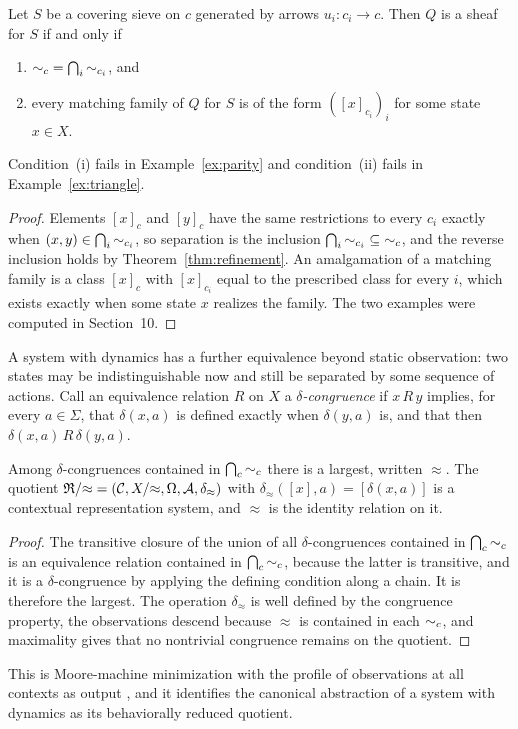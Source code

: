 \begin{proposition}\label{prop:Qglue}
Let $S$ be a covering sieve on $c$ generated by arrows $u_i:c_i\to c$. Then $Q$ is a sheaf for $S$ if and only if
\begin{enumerate}[label=(\roman*)]
\item ${\sim_c}=\bigcap_i{\sim_{c_i}}$, and
\item every matching family of $Q$ for $S$ is of the form $([x]_{c_i})_i$ for some state $x\in X$.
\end{enumerate}
Condition~(i) fails in Example~\ref{ex:parity} and condition~(ii) fails in Example~\ref{ex:triangle}.
\end{proposition}
\begin{proof}
Elements $[x]_c$ and $[y]_c$ have the same restrictions to every $c_i$ exactly when $(x,y)\in\bigcap_i{\sim_{c_i}}$, so separation is the inclusion $\bigcap_i{\sim_{c_i}}\subseteq{\sim_c}$, and the reverse inclusion holds by Theorem~\ref{thm:refinement}. An amalgamation of a matching family is a class $[x]_c$ with $[x]_{c_i}$ equal to the prescribed class for every $i$, which exists exactly when some state $x$ realizes the family. The two examples were computed in Section~10.
\end{proof}

A system with dynamics has a further equivalence beyond static observation: two states may be indistinguishable now and still be separated by some sequence of actions. Call an equivalence relation $R$ on $X$ a \emph{$\delta$-congruence} if $x\,R\,y$ implies, for every $a\in\Sigma$, that $\delta(x,a)$ is defined exactly when $\delta(y,a)$ is, and that then $\delta(x,a)\,R\,\delta(y,a)$.

\begin{proposition}\label{prop:minimization}
Among $\delta$-congruences contained in $\bigcap_c{\sim_c}$ there is a largest, written $\approx$. The quotient $\mathfrak R/{\approx}=(\mathcal C,X/{\approx},\Omega,\mathcal A,\delta_{\approx})$ with $\delta_{\approx}([x],a)=[\delta(x,a)]$ is a contextual representation system, and $\approx$ is the identity relation on it.
\end{proposition}
\begin{proof}
The transitive closure of the union of all $\delta$-congruences contained in $\bigcap_c{\sim_c}$ is an equivalence relation contained in $\bigcap_c{\sim_c}$, because the latter is transitive, and it is a $\delta$-congruence by applying the defining condition along a chain. It is therefore the largest. The operation $\delta_\approx$ is well defined by the congruence property, the observations descend because $\approx$ is contained in each $\sim_c$, and maximality gives that no nontrivial congruence remains on the quotient.
\end{proof}

This is Moore-machine minimization with the profile of observations at all contexts as output \cite{moore,sangiorgi}, and it identifies the canonical abstraction of a system with dynamics as its behaviorally reduced quotient.

